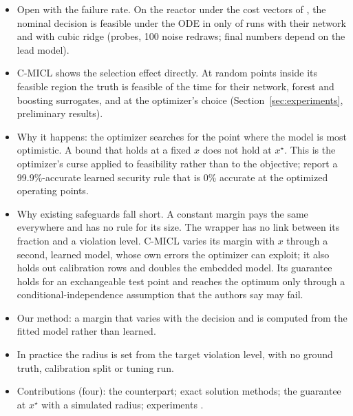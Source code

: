 \begin{outline}
\begin{itemize}
  \item Open with the failure rate. On the reactor under the cost
    vectors of \citet{ovalle2025cmicl}, the nominal decision is feasible under
    the ODE in only  of runs with their network and
     with cubic ridge (probes, 100 noise redraws; final numbers
    depend on the lead model).
  \item C-MICL shows the selection effect directly. At random
    points inside its feasible region the truth is feasible 
    of the time for their network, forest and boosting surrogates, and at the
    optimizer's choice  (Section~\ref{sec:experiments},
    preliminary results).
  \item Why it happens: the optimizer searches for the point where the model
    is most optimistic. A bound that holds at a fixed $x$ does not hold at
    $x^\star$. This is the optimizer's curse \citep{smith2006optimizer}
    applied to feasibility rather than to the objective;
    \citet{cremer2019datadriven} report a 99.9\%-accurate learned security
    rule that is 0\% accurate at the optimized operating points.
  \item Why existing safeguards fall short. A constant margin pays the same
    everywhere and has no rule for its size. The wrapper
    \citep{maragno2025mixed} has no link between its fraction and a violation
    level. C-MICL \citep{ovalle2025cmicl} varies its margin with $x$ through a
    second, learned model, whose own errors the optimizer can exploit; it also
    holds out calibration rows and doubles the embedded model. Its guarantee
    holds for an exchangeable test point and reaches the optimum only through
    a conditional-independence assumption that the authors say may fail.
  \item Our method: a margin that varies with the decision and is computed
    from the fitted model rather than learned.
  \item In practice the radius is set from the target violation level, with
    no ground truth, calibration split or tuning run.
  \item Contributions (four): the counterpart; exact solution methods; the
    guarantee at $x^\star$ with a simulated radius; experiments .
\end{itemize}
\end{outline}

